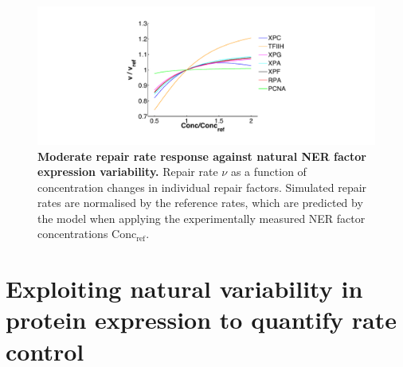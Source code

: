 \begin{figure}[htbp]
	\begin{center}
		\includegraphics[width=1\textwidth]{Abbildungen/figure3_1_b.pdf}
		\caption{\textbf{Moderate repair rate response against natural NER factor expression variability.} Repair rate $\nu$ as a function of concentration changes in individual repair factors. Simulated repair rates are normalised by the reference rates, which are predicted by the model when applying the experimentally measured NER factor concentrations $\text{Conc}_{\text{ref}}$.} 
		\label{fig:R_largeProteinVariation}
	\end{center}
\end{figure}


\section{Exploiting natural variability in protein expression to quantify rate control}
\label{natural_Variability_m}


